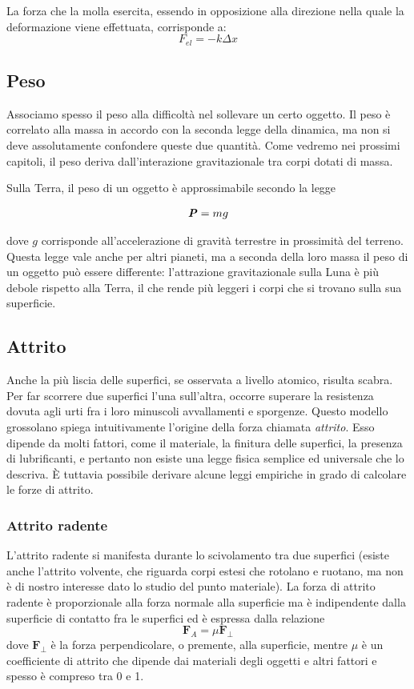 La forza che la molla esercita, essendo in opposizione alla direzione nella
quale la deformazione viene effettuata, corrisponde a:
\[ F_\textit{el} = -k\Delta x \]


\subsection{Peso}
Associamo spesso il peso alla difficoltà nel sollevare un certo oggetto.
Il peso è correlato alla massa in accordo con la seconda legge della
dinamica, ma non si deve assolutamente confondere queste due quantità.
Come vedremo nei prossimi capitoli, il peso deriva dall'interazione
gravitazionale tra corpi dotati di massa.

Sulla Terra, il peso di un oggetto è approssimabile secondo la legge

\begin{align}
    \textbf{\textit{P}} = mg
\end{align}

\noindent dove $g$ corrisponde all'accelerazione di gravità terrestre
in prossimità del terreno. Questa legge vale anche per altri pianeti,
ma a seconda della loro massa il peso di un oggetto può essere differente:
l'attrazione gravitazionale sulla Luna è più debole rispetto alla Terra,
il che rende più leggeri i corpi che si trovano sulla sua superficie.

\subsection{Attrito}
Anche la più liscia delle superfici, se osservata a livello atomico, risulta
scabra. Per far scorrere due superfici l'una sull'altra, occorre superare la
resistenza dovuta agli urti fra i loro minuscoli avvallamenti e sporgenze. Questo
modello grossolano spiega intuitivamente l'origine della forza chiamata
\textit{attrito}. Esso dipende da molti fattori, come il materiale, la finitura
delle superfici, la presenza di lubrificanti, e pertanto non esiste una legge
fisica semplice ed universale che lo descriva. È tuttavia possibile derivare
alcune leggi empiriche in grado di calcolare le forze di attrito.

\subsubsection*{Attrito radente}
L'attrito radente si manifesta durante lo scivolamento tra due superfici (esiste
anche l'attrito volvente, che riguarda corpi estesi che rotolano e ruotano, ma non
è di nostro interesse dato lo studio del punto materiale). La forza di attrito
radente è proporzionale alla forza normale alla superficie ma è indipendente dalla
superficie di contatto fra le superfici ed è espressa dalla relazione
\[ \textbf{F}_A = \mu\mathbf{F}_\perp \]
dove $\mathbf{F}_\perp$ è la forza perpendicolare, o premente, alla superficie,
mentre $\mu$ è un coefficiente di attrito che dipende dai materiali degli oggetti
e altri fattori e spesso è compreso tra 0 e 1.

